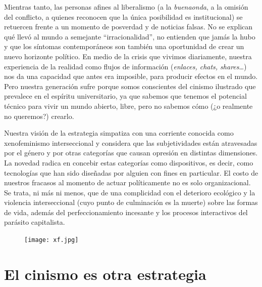 Mientras tanto, las personas afines al liberalismo (a la \emph{buenaonda}, a la omisión del conflicto, a quienes reconocen que la única posibilidad es institucional) se retuercen frente a un momento de posverdad y de noticias falsas. No se explican qué llevó al mundo a semejante \enquote{irracionalidad}, no entienden que jamás la hubo y que los síntomas contemporáneos son también una oportunidad de crear un nuevo horizonte político. En medio de la crisis que vivimos diariamente, nuestra experiencia de la realidad como flujos de información (\emph{enlaces, chats, shares}\ldots{}) nos da una capacidad que antes era imposible, para producir efectos en el mundo. Pero nuestra generación sufre porque somos conscientes del cinismo ilustrado que prevalece en el espíritu universitario, ya que sabemos que tenemos el potencial técnico para vivir un mundo abierto, libre, pero no sabemos cómo (¿o realmente no queremos?) crearlo.

Nuestra visión de la estrategia simpatiza con una corriente conocida como xenofeminismo interseccional\addref{} y considera que las subjetividades están atravesadas por el género y por otras categorías que causan opresión en distintas dimensiones. La novedad radica en concebir estas categorías como dispositivos, es decir, como tecnologías que han sido diseñadas por alguien con fines en particular. El costo de nuestros fracasos al momento de actuar políticamente no es solo organizacional. Se trata, ni más ni menos, que de una complicidad con el deterioro ecológico y la violencia interseccional (cuyo punto de culminación es la muerte) sobre las formas de vida, además del perfeccionamiento incesante y los procesos interactivos del parásito capitalista.

\begin{figure}[htbp]
	\centering
	\texttt{[image: xf.jpg]}
	\caption{}
	\label{fig:xf}
\end{figure}

\section{El cinismo es otra estrategia}
\label{sec:cinismo}

